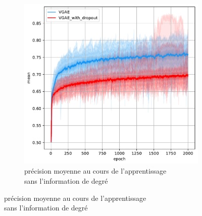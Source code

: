 \documentclass{article}
\begin{document}
\begin{figure}[H]
\begin{subfigure}{0.45\textwidth}
      \includegraphics[width=\textwidth]{graphics/APs_no_degree_dropout_cinf.svg.pdf}
      \centering
      \caption{précision moyenne au cours de l'apprentissage\\ sans l'information de degré}
    \end{subfigure}
    

\end{figure}
\end{document}

